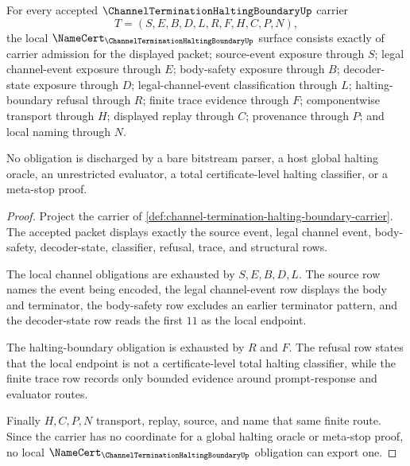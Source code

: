 \begin{theorem}
\label{thm:channel-termination-halting-boundary-namecert-obligations}
For every accepted $\ChannelTerminationHaltingBoundaryUp$ carrier
$$
T=(S,E,B,D,L,R,F,H,C,P,N),
$$
the local $\NameCert_{\ChannelTerminationHaltingBoundaryUp}$ surface consists exactly of carrier admission for the displayed packet; source-event exposure through $S$; legal channel-event exposure through $E$; body-safety exposure through $B$; decoder-state exposure through $D$; legal-channel-event classification through $L$; halting-boundary refusal through $R$; finite trace evidence through $F$; componentwise transport through $H$; displayed replay through $C$; provenance through $P$; and local naming through $N$.

No obligation is discharged by a bare bitstream parser, a host global halting oracle, an unrestricted evaluator, a total certificate-level halting classifier, or a meta-stop proof.
\end{theorem}
\begin{proof}
Project the carrier of \autoref{def:channel-termination-halting-boundary-carrier}. The accepted packet displays exactly the source event, legal channel event, body-safety, decoder-state, classifier, refusal, trace, and structural rows.

The local channel obligations are exhausted by $S,E,B,D,L$. The source row names the event being encoded, the legal channel-event row displays the body and terminator, the body-safety row excludes an earlier terminator pattern, and the decoder-state row reads the first $11$ as the local endpoint.

The halting-boundary obligation is exhausted by $R$ and $F$. The refusal row states that the local endpoint is not a certificate-level total halting classifier, while the finite trace row records only bounded evidence around prompt-response and evaluator routes.

Finally $H,C,P,N$ transport, replay, source, and name that same finite route. Since the carrier has no coordinate for a global halting oracle or meta-stop proof, no local $\NameCert_{\ChannelTerminationHaltingBoundaryUp}$ obligation can export one.
\end{proof}

